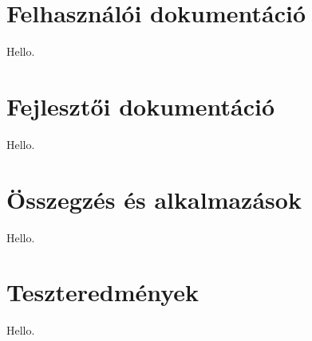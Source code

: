 \documentclass[final]{elteikthesis}[2025/03/25]
\begin{document}
\cleardoublepage

\chapter{Felhasználói dokumentáció}

Hello.

\cleardoublepage

\chapter{Fejlesztői dokumentáció}

Hello.

\cleardoublepage

\chapter{Összegzés és alkalmazások}

Hello.

\cleardoublepage

\appendix

\chapter{Teszteredmények}

Hello.

\cleardoublepage

{}
\printbibliography[title=\biblabel]
\cleardoublepage

{}
\listoffigures
\cleardoublepage

{}
\listoftables
\cleardoublepage

{}
\listofalgorithms
\cleardoublepage

{}
\lstlistoflistings
\cleardoublepage
\end{document}
